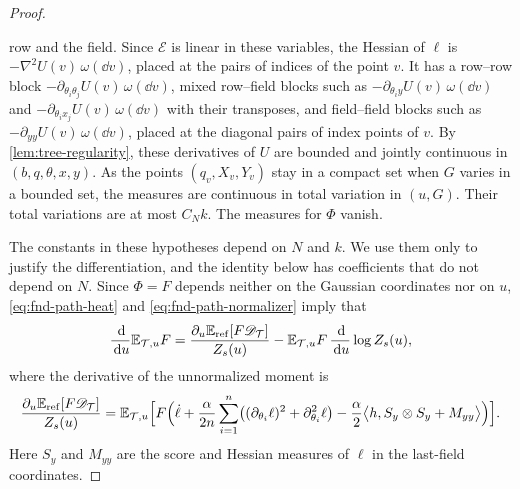 \begin{proof}
\begin{itemize}
row and the field. Since $\mathcal E$ is linear in these variables, the
Hessian of $\ell$ is $-\nabla^2U(v)\,\omega(\dd v)$, placed at the pairs
of indices of the point $v$. It has a row--row block
$-\partial_{\theta_i\theta_j}U(v)\,\omega(\dd v)$, mixed row--field
blocks such as $-\partial_{\theta_iy}U(v)\,\omega(\dd v)$ and
$-\partial_{\theta_ix_j}U(v)\,\omega(\dd v)$ with their transposes, and
field--field blocks such as $-\partial_{yy}U(v)\,\omega(\dd v)$, placed at
the diagonal pairs of index points of $v$. By
\cref{lem:tree-regularity}, these derivatives of $U$ are bounded and
jointly continuous in $(b,q,\theta,x,y)$. As the points $(q_v,X_v,Y_v)$
stay in a compact set when $G$ varies in a bounded set, the measures are
continuous in total variation in $(u,G)$. Their total variations are
at most $C_Nk$. The measures for $\Phi$ vanish.
\end{itemize}
The constants in these hypotheses depend on $N$ and $k$. We use them
only to justify the differentiation, and the identity below has
coefficients that do not depend on $N$. Since $\Phi=F$ depends neither on
the Gaussian coordinates nor on $u$, \eqref{eq:fnd-path-heat} and
\eqref{eq:fnd-path-normalizer} imply that
\begin{equation}\label{eq:tree-quotient}
 \frac{\,\mathrm d}{\,\mathrm d u}\mathbb E_{\mathcal T,u}F
 =\frac{\partial_u\mathbb E_{\rm ref}[F\mathscr D_{\mathcal T}]}{Z_s(u)}
 -\mathbb E_{\mathcal T,u}F\,\frac{\,\mathrm d}{\,\mathrm d u}\log Z_s(u),
\end{equation}
where the derivative of the unnormalized moment is
\[
 \frac{\partial_u\mathbb E_{\rm ref}[F\mathscr D_{\mathcal T}]}{Z_s(u)}
 =\mathbb E_{\mathcal T,u}\Bigl[F\Bigl(\dot\ell+\frac\alpha{2n}\sum_{i=1}^n
   \bigl((\partial_{\theta_i}\ell)^2+\partial_{\theta_i}^2\ell\bigr)
   -\frac\alpha2\bigl\langle h,S_y\otimes S_y+M_{yy}\bigr\rangle\Bigr)\Bigr].
\]
Here $S_y$ and $M_{yy}$ are the score and Hessian measures of $\ell$ in
the last-field coordinates.


\end{proof}
